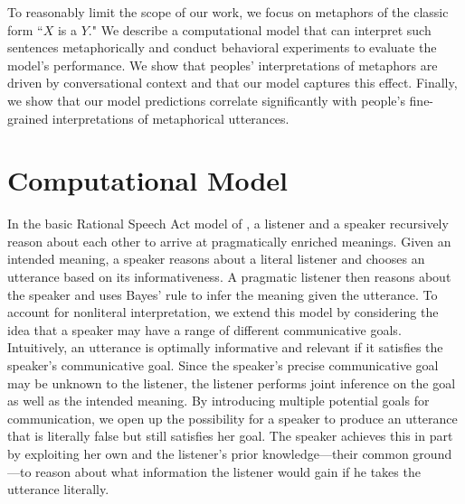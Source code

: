 \documentclass[10pt,letterpaper]{article}
\begin{document}
To reasonably limit the scope of our work, we focus on metaphors of the classic form ``$X$ is a $Y$." We describe a computational model that can interpret such sentences metaphorically and conduct behavioral experiments to evaluate the model's performance. We show that peoples' interpretations of metaphors are driven by conversational context and that our model captures this effect. Finally, we show that our model predictions correlate significantly with people's fine-grained interpretations of metaphorical utterances.

\section{Computational Model}
In the basic Rational Speech Act model of \cite{frank2012predicting, goodman2013knowledge}, a listener and a speaker recursively reason about each other to arrive at pragmatically enriched meanings. Given an intended meaning, a speaker reasons about a literal listener and chooses an utterance based on its informativeness. A pragmatic listener then reasons about the speaker and uses Bayes' rule to infer the meaning given the utterance. To account for nonliteral interpretation, we extend this model by considering the idea that a speaker may have a range of different communicative goals. Intuitively, an utterance is optimally informative and relevant if it satisfies the speaker's communicative goal. Since the speaker's precise communicative goal may be unknown to the listener, the listener performs joint inference on the goal as well as the intended meaning. By introducing multiple potential goals for communication, we open up the possibility for a speaker to produce an utterance that is literally false but still satisfies her goal. The speaker achieves this in part by exploiting her own and the listener's prior knowledge---their common ground \cite{clark1996using}---to reason about what information the listener would gain if he takes the utterance literally. 
\end{document}
